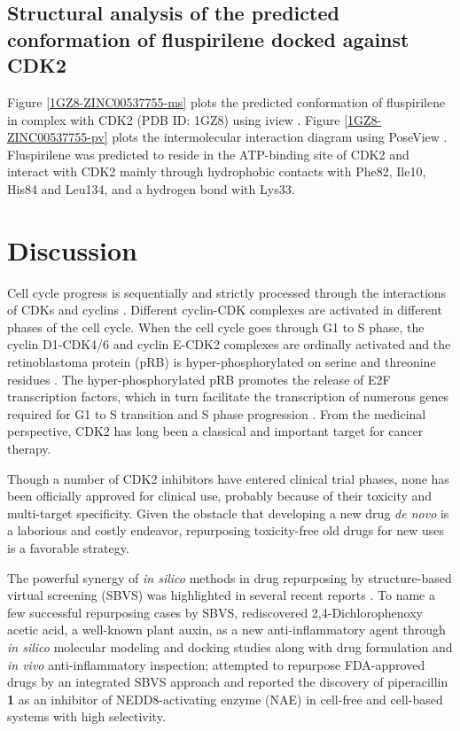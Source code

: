 \documentclass[10pt]{article}
\begin{document}
\subsection*{Structural analysis of the predicted conformation of fluspirilene docked against CDK2}

Figure \ref{1GZ8-ZINC00537755-ms} plots the predicted conformation of fluspirilene in complex with CDK2 (PDB ID: 1GZ8) using iview \cite{1366}. Figure \ref{1GZ8-ZINC00537755-pv} plots the intermolecular interaction diagram using PoseView \cite{748}. Fluspirilene was predicted to reside in the ATP-binding site of CDK2 and interact with CDK2 mainly through hydrophobic contacts with Phe82, Ile10, His84 and Leu134, and a hydrogen bond with Lys33.

\section*{Discussion}

Cell cycle progress is sequentially and strictly processed through the interactions of CDKs and cyclins \cite{1612}. Different cyclin-CDK complexes are activated in different phases of the cell cycle. When the cell cycle goes through G1 to S phase, the cyclin D1-CDK4/6 and cyclin E-CDK2 complexes are ordinally activated and the retinoblastoma protein (pRB) is hyper-phosphorylated on serine and threonine residues \cite{1613}. The hyper-phosphorylated pRB promotes the release of E2F transcription factors, which in turn facilitate the transcription of numerous genes required for G1 to S transition and S phase progression \cite{1614}. From the medicinal perspective, CDK2 has long been a classical and important target for cancer therapy.

Though a number of CDK2 inhibitors have entered clinical trial phases, none has been officially approved for clinical use, probably because of their toxicity and multi-target specificity. Given the obstacle that developing a new drug \textit{de novo} is a laborious and costly endeavor, repurposing toxicity-free old drugs for new uses is a favorable strategy.

The powerful synergy of \textit{in silico} methods in drug repurposing by structure-based virtual screening (SBVS) was highlighted in several recent reports \cite{1384}. To name a few successful repurposing cases by SBVS, \cite{1507} rediscovered 2,4-Dichlorophenoxy acetic acid, a well-known plant auxin, as a new anti-inflammatory agent through \textit{in silico} molecular modeling and docking studies along with drug formulation and \textit{in vivo} anti-inflammatory inspection; \cite{1506} attempted to repurpose FDA-approved drugs by an integrated SBVS approach and reported the discovery of piperacillin \textbf{1} as an inhibitor of NEDD8-activating enzyme (NAE) in cell-free and cell-based systems with high selectivity.
\end{document}
